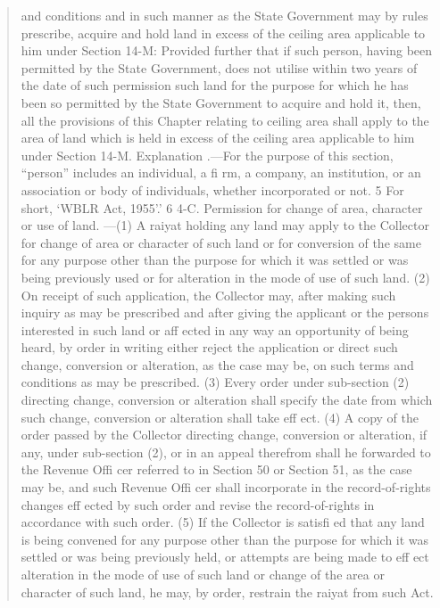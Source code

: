 \documentclass[12pt,a4paper]{article}
\newenvironment{judgequote}
  {\begin{quote}\small}
  {\end{quote}}
\begin{document}
\begin{judgequote}
and conditions and in such manner as the State Government may by rules prescribe, acquire
and hold land in excess of the ceiling area applicable to him under Section 14-M:
Provided further that if such person, having been permitted by the State Government,
does not utilise within two years of the date of such permission such land for the purpose
for which he has been so permitted by the State Government to acquire and hold it, then, all
the provisions of this Chapter relating to ceiling area shall apply to the area of land which
is held in excess of the ceiling area applicable to him under Section 14-M.
Explanation .---For the purpose of this section, ``person'' includes an individual,
a fi rm, a company, an institution, or an association or body of individuals, whether
incorporated or not.
5 For short, `WBLR Act, 1955'.'
6 4-C. Permission for change of area, character or use of land. ---(1) A raiyat holding
any land may apply to the Collector for change of area or character of such land or for
conversion of the same for any purpose other than the purpose for which it was settled or
was being previously used or for alteration in the mode of use of such land.
(2) On receipt of such application, the Collector may, after making such inquiry
as may be prescribed and after giving the applicant or the persons interested in such land
or aff ected in any way an opportunity of being heard, by order in writing either reject the
application or direct such change, conversion or alteration, as the case may be, on such
terms and conditions as may be prescribed.
(3) Every order under sub-section (2) directing change, conversion or alteration shall
specify the date from which such change, conversion or alteration shall take eff ect.
(4) A copy of the order passed by the Collector directing change, conversion or
alteration, if any, under sub-section (2), or in an appeal therefrom shall he forwarded to
the Revenue Offi cer referred to in Section 50 or Section 51, as the case may be, and such
Revenue Offi cer shall incorporate in the record-of-rights changes eff ected by such order
and revise the record-of-rights in accordance with such order.
(5) If the Collector is satisfi ed that any land is being convened for any purpose other
than the purpose for which it was settled or was being previously held, or attempts are being
made to eff ect alteration in the mode of use of such land or change of the area or character
of such land, he may, by order, restrain the raiyat from such Act.
\end{judgequote}
\end{document}

